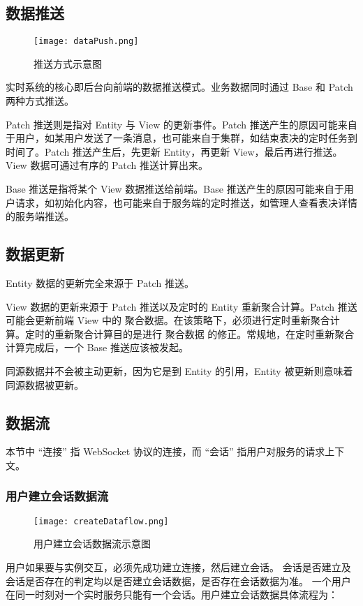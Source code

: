 \subsection{数据推送}

\begin{figure}[!htp]
  \centering
  \texttt{[image: dataPush.png]}
  \caption[推送方式]
    {推送方式示意图}
 \label{fig:dataPush}
\end{figure}

实时系统的核心即后台向前端的数据推送模式。业务数据同时通过 Base 和 Patch 两种方式推送。

Patch 推送则是指对 Entity 与 View 的更新事件。Patch 推送产生的原因可能来自于用户，如某用户发送了一条消息，也可能来自于集群，如结束表决的定时任务到时间了。Patch 推送产生后，先更新 Entity，再更新 View，最后再进行推送。View 数据可通过有序的 Patch 推送计算出来。

Base 推送是指将某个 View 数据推送给前端。Base 推送产生的原因可能来自于用户请求，如初始化内容，也可能来自于服务端的定时推送，如管理人查看表决详情的服务端推送。

\subsection{数据更新}

Entity 数据的更新完全来源于 Patch 推送。

View 数据的更新来源于 Patch 推送以及定时的 Entity 重新聚合计算。Patch 推送可能会更新前端 View 中的 聚合数据。在该策略下，必须进行定时重新聚合计算。定时的重新聚合计算目的是进行 聚合数据 的修正。常规地，在定时重新聚合计算完成后，一个 Base 推送应该被发起。

同源数据并不会被主动更新，因为它是到 Entity 的引用，Entity 被更新则意味着同源数据被更新。

\subsection{数据流}
本节中 “连接” 指 WebSocket 协议的连接，而 “会话” 指用户对服务的请求上下文。
\subsubsection{用户建立会话数据流}
\begin{figure}[!htp]
  \centering
  \texttt{[image: createDataflow.png]}
  \caption[建立数据流]
    {用户建立会话数据流示意图}
 \label{fig:createDataflow}
\end{figure}
用户如果要与实例交互，必须先成功建立连接，然后建立会话。
会话是否建立及会话是否存在的判定均以是否建立会话数据，是否存在会话数据为准。
一个用户在同一时刻对一个实时服务只能有一个会话。用户建立会话数据具体流程为：

